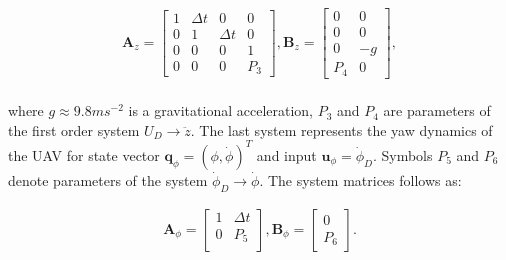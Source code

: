 \begin{equation}
\begin{split}
\mathbf{A}_{z} = \begin{bmatrix}
1 & \Delta t & 0 & 0\\
0 & 1 & \Delta t & 0\\
0 & 0 & 0 & 1 \\
0 & 0 & 0 & P_3
\end{bmatrix}, \mathbf{B}_{z} = \begin{bmatrix}
0 & 0\\
0 & 0\\
0 & -g\\
P_4 & 0
\end{bmatrix},
\end{split}
\label{eq:altitude_LTI}
\end{equation}
\\
where $g \approx 9.8 ms^{-2}$ is a gravitational acceleration, $P_3$ and $P_4$ are parameters of the first order system $U_D \rightarrow \ddot{z}$. The last system represents the yaw dynamics of the UAV for state vector $\mathbf{q}_{\phi} = \left(\phi, \dot{\phi}\right)^T$ and input $\mathbf{u}_\phi = \dot{\phi}_D$. Symbols $P_5$ and $P_6$ denote parameters of the system $\dot{\phi}_D \rightarrow \dot{\phi}$. The system matrices follows as:

\begin{equation}
\begin{split}
\mathbf{A}_{\phi} = \begin{bmatrix}
1 & \Delta t\\
0 & P_5 \\
\end{bmatrix}, \mathbf{B}_{\phi} = \begin{bmatrix}
0\\
P_6
\end{bmatrix}.
\end{split}
\end{equation}